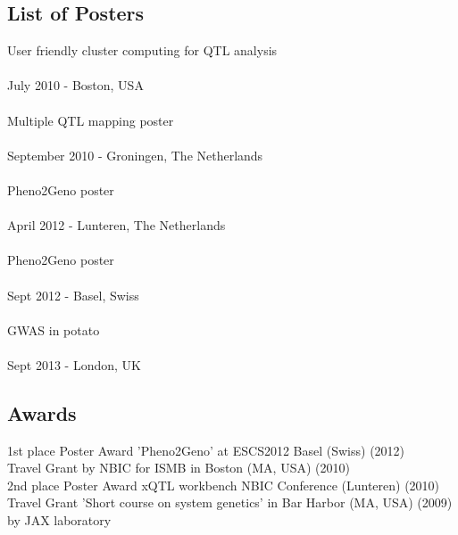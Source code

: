 \subsection{List of Posters}
User friendly cluster computing for QTL analysis\\
  \\
   July 2010 - Boston, USA\\\\
Multiple QTL mapping poster\\
  \\
   September 2010 - Groningen, The Netherlands\\\\
Pheno2Geno poster\\
  \\
   April 2012 - Lunteren, The Netherlands\\\\
Pheno2Geno poster\\
  \\
   Sept 2012 - Basel, Swiss\\\\
GWAS in potato\\
  \\
   Sept 2013 - London, UK

\subsection{Awards}
1st place Poster Award 'Pheno2Geno' at ESCS2012 Basel (Swiss) (2012)\\
Travel Grant by NBIC for ISMB in Boston (MA, USA) (2010)\\
2nd place Poster Award xQTL workbench NBIC Conference (Lunteren) (2010)\\
Travel Grant 'Short course on system genetics' in Bar Harbor (MA, USA) (2009) by JAX laboratory\\
